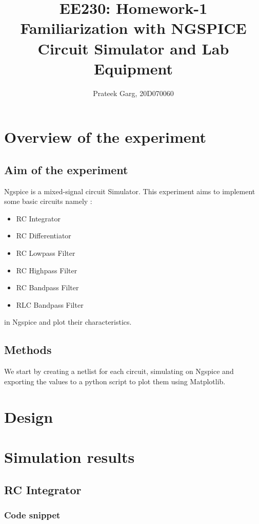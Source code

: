 \documentclass[12pt]{article}
\title{EE230: Homework-1\\
Familiarization with NGSPICE Circuit Simulator and Lab Equipment}
\author{Prateek Garg, 20D070060}
\begin{document}
\noindent
\maketitle

\section{Overview of the experiment} %

\subsection{Aim of the experiment}%

Ngspice is a mixed-signal circuit Simulator. This experiment aims to implement some basic circuits namely :
\begin{itemize}
	\item RC Integrator
	\item RC Differentiator
	\item RC Lowpass Filter
	\item RC Highpass Filter
	\item RC Bandpass Filter
	\item RLC Bandpass Filter
\end{itemize}
in Ngspice and plot their characteristics.

\subsection{Methods}

We start by creating a netlist for each circuit, simulating on Ngspice and exporting the values to a python script to plot them using Matplotlib.
\section{Design}

\section{Simulation results}

\subsection{RC Integrator}
\subsubsection{Code snippet}

\end{document}
